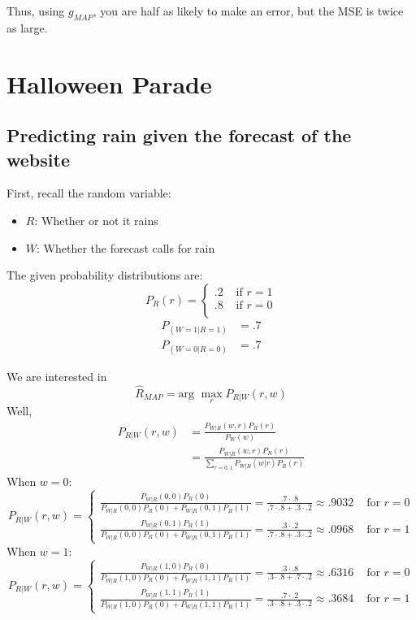 \documentclass[paper=a4, fontsize=11pt]{scrartcl} %
\numberwithin{equation}{section} %
\numberwithin{figure}{section} %
\numberwithin{table}{section} %
\begin{document}
Thus, using $g_{MAP}$, you are half as likely to make an error, but the MSE is twice as large.


\section{Halloween Parade}

\subsection{Predicting rain given the forecast of the website}

First, recall the random variable:
\begin{itemize}
\item $R$: Whether or not it rains
\item $W$: Whether the forecast calls for rain
\end{itemize}
The given probability distributions are:
\[
P_R(r) =
\begin{cases}
   .2 & \textrm{ if } r = 1\\
   .8 & \textrm{ if } r = 0\\
\end{cases}
\]
\begin{align*}
P_(W = 1 | R = 1) &= .7\\
P_(W = 0 | R = 0) &= .7
\end{align*}

We are interested in
\[\hat{R}_{MAP} = \textrm{arg } \max_r P_{R | W}(r, w) \]
Well,
\begin{align*}
P_{R | W}(r, w) &= \frac{P_{W | R}(w, r) P_R(r)}{P_W(w)} \\
   &= \frac{P_{W | R}(w, r) P_R(r)}{\sum_{r = 0, 1} P_{W | R}(w | r) P_R(r)}
\end{align*}
When $w = 0$:
\[
P_{R | W}(r, w) =
\begin{cases}
 \frac{P_{W | R}(0, 0) P_R(0)}{P_{W | R}(0, 0) P_R(0) + P_{W | R}(0, 1) P_R(1)} = \frac{.7 \cdot .8}{.7 \cdot .8  + .3 \cdot .2} \approx .9032  & \textrm{ for } r = 0 \\
  \frac{P_{W | R}(0, 1) P_R(1)}{P_{W | R}(0, 0) P_R(0) + P_{W | R}(0, 1) P_R(1)} = \frac{.3 \cdot .2}{.7 \cdot .8  + .3 \cdot .2} \approx .0968  & \textrm{ for } r = 1
\end{cases}
\]
When $w = 1$:
\[
P_{R | W}(r, w) =
\begin{cases}
 \frac{P_{W | R}(1, 0) P_R(0)}{P_{W | R}(1, 0) P_R(0) + P_{W | R}(1, 1) P_R(1)} = \frac{.3 \cdot .8}{.3 \cdot .8  + .7 \cdot .2} \approx .6316  & \textrm{ for } r = 0 \\
  \frac{P_{W | R}(1, 1) P_R(1)}{P_{W | R}(1, 0) P_R(0) + P_{W | R}(1, 1) P_R(1)} = \frac{.7 \cdot .2}{.3 \cdot .8  + .3 \cdot .2} \approx .3684  & \textrm{ for } r = 1
\end{cases}
\]
\end{document}
